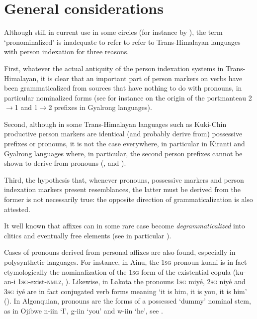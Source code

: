 \documentclass[oldfontcommands,oneside,a4paper,11pt]{article}
\newcommand{\ipa}[1]{{\phon \mbox{#1}}} %
\begin{document}
\section{General considerations}
Although still in current use in some circles (for instance by \citealt{zeisler15eat}), the term `pronominalized'  is inadequate to refer to refer to Trans-Himalayan languages with person indexation for three reasons.

First, whatever the actual antiquity of the person indexation systems in Trans-Himalayan, it is clear that an important part of person markers on verbs have been grammaticalized from sources that have nothing to do with pronouns, in particular nominalized forms (see for instance \citealt{jacques15generic} on the origin of the portmanteau 2$\rightarrow$1 and 1$\rightarrow$2 prefixes in Gyalrong languages).

Second, although in some Trans-Himalayan languages such as Kuki-Chin productive person markers are identical (and probably derive from) possessive prefixes or pronouns, it is not the case everywhere, in particular in Kiranti and Gyalrong languages where, in particular, the second person prefixes cannot be shown to derive from pronouns (\citealt{jacques12agreement}, \citealt{delancey11prefixes} and \citealt{delancey14second}).

Third, the hypothesis that, whenever pronouns, possessive markers and person indexation markers present resemblances, the latter must be derived from the former is not necessarily true: the opposite direction of grammaticalization is also attested. 
 
It well known that affixes can in some rare case become \textit{degrammaticalized} into clitics and eventually free elements (see in particular \citealt{norde09degrammaticalization, hyman11macrosudan}). 

Cases of pronouns derived from personal affixes are also found, especially in polysynthetic languages. For instance, in Ainu, the \textsc{1sg} pronoun \ipa{kuani} is in fact etymologically the nominalization of the \textsc{1sg} form of the existential copula (\ipa{ku-an-i} \textsc{1sg}-exist-\textsc{nmlz}, \citealt[31]{shibatani90japan}). Likewise, in Lakota the pronouns \textsc{1sg} \ipa{miyé}, \textsc{2sg} \ipa{niyé} and \textsc{3sg} \ipa{iyé} are in fact conjugated verb forms meaning `it is him, it is you, it is him' (\citealt[707;754]{ullrich08}). In Algonquian,   pronouns are the forms of a possessed `dummy' nominal stem, as in Ojibwe \ipa{n-iin} `I', \ipa{g-iin} `you' and \ipa{w-iin} `he', see \citet{valentine01grammar}. 
\end{document}
